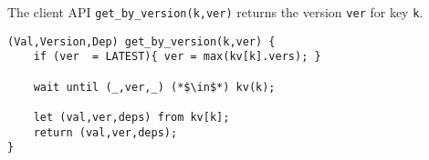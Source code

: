 The client API \verb|get_by_version(k,ver)| returns the version \verb|ver| for key \verb|k|.

\begin{lstlisting}[caption={Replica API for read},label={lst:cops-replica-read}]
(Val,Version,Dep) get_by_version(k,ver) {
    if (ver  = LATEST){ ver = max(kv[k].vers); }

    wait until (_,ver,_) (*$\in$*) kv(k);
    
    let (val,ver,deps) from kv[k];
    return (val,ver,deps);
}
\end{lstlisting}
